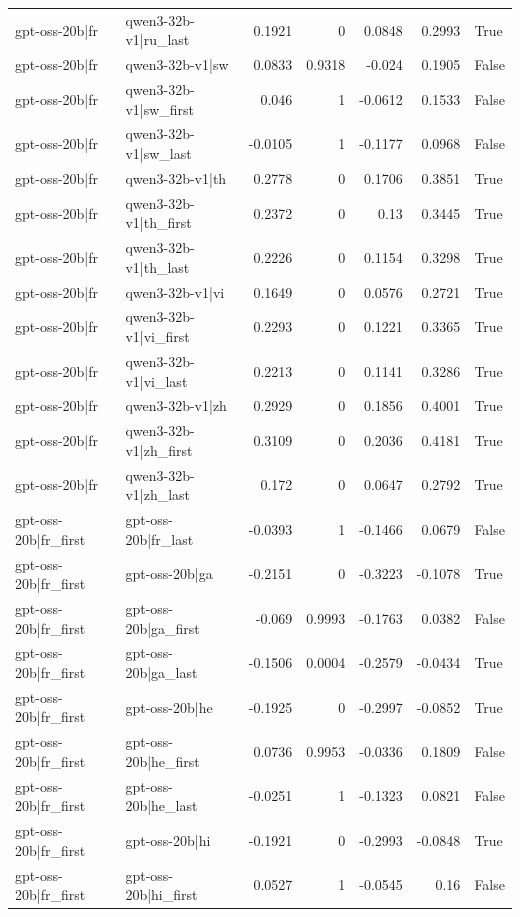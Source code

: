 \begin{table}
\begin{tabular}{l l r r r r l}
gpt-oss-20b|fr & qwen3-32b-v1|ru_last & 0.1921 & 0 & 0.0848 & 0.2993 & True \\
gpt-oss-20b|fr & qwen3-32b-v1|sw & 0.0833 & 0.9318 & -0.024 & 0.1905 & False \\
gpt-oss-20b|fr & qwen3-32b-v1|sw_first & 0.046 & 1 & -0.0612 & 0.1533 & False \\
gpt-oss-20b|fr & qwen3-32b-v1|sw_last & -0.0105 & 1 & -0.1177 & 0.0968 & False \\
gpt-oss-20b|fr & qwen3-32b-v1|th & 0.2778 & 0 & 0.1706 & 0.3851 & True \\
gpt-oss-20b|fr & qwen3-32b-v1|th_first & 0.2372 & 0 & 0.13 & 0.3445 & True \\
gpt-oss-20b|fr & qwen3-32b-v1|th_last & 0.2226 & 0 & 0.1154 & 0.3298 & True \\
gpt-oss-20b|fr & qwen3-32b-v1|vi & 0.1649 & 0 & 0.0576 & 0.2721 & True \\
gpt-oss-20b|fr & qwen3-32b-v1|vi_first & 0.2293 & 0 & 0.1221 & 0.3365 & True \\
gpt-oss-20b|fr & qwen3-32b-v1|vi_last & 0.2213 & 0 & 0.1141 & 0.3286 & True \\
gpt-oss-20b|fr & qwen3-32b-v1|zh & 0.2929 & 0 & 0.1856 & 0.4001 & True \\
gpt-oss-20b|fr & qwen3-32b-v1|zh_first & 0.3109 & 0 & 0.2036 & 0.4181 & True \\
gpt-oss-20b|fr & qwen3-32b-v1|zh_last & 0.172 & 0 & 0.0647 & 0.2792 & True \\
gpt-oss-20b|fr_first & gpt-oss-20b|fr_last & -0.0393 & 1 & -0.1466 & 0.0679 & False \\
gpt-oss-20b|fr_first & gpt-oss-20b|ga & -0.2151 & 0 & -0.3223 & -0.1078 & True \\
gpt-oss-20b|fr_first & gpt-oss-20b|ga_first & -0.069 & 0.9993 & -0.1763 & 0.0382 & False \\
gpt-oss-20b|fr_first & gpt-oss-20b|ga_last & -0.1506 & 0.0004 & -0.2579 & -0.0434 & True \\
gpt-oss-20b|fr_first & gpt-oss-20b|he & -0.1925 & 0 & -0.2997 & -0.0852 & True \\
gpt-oss-20b|fr_first & gpt-oss-20b|he_first & 0.0736 & 0.9953 & -0.0336 & 0.1809 & False \\
gpt-oss-20b|fr_first & gpt-oss-20b|he_last & -0.0251 & 1 & -0.1323 & 0.0821 & False \\
gpt-oss-20b|fr_first & gpt-oss-20b|hi & -0.1921 & 0 & -0.2993 & -0.0848 & True \\
gpt-oss-20b|fr_first & gpt-oss-20b|hi_first & 0.0527 & 1 & -0.0545 & 0.16 & False \\

\end{tabular}
\end{table}
